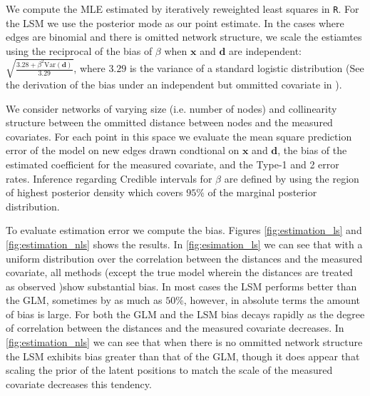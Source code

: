 \documentclass[11pt]{article}
\begin{document}
We compute the MLE estimated by iteratively reweighted least squares in \texttt{R}. For the LSM we use the posterior mode as our point estimate. In the cases where edges are binomial and there is omitted network structure, we scale the estiamtes using the reciprocal of the bias of $\beta$ when $\mathbf{x}$ and $\mathbf{d}$ are independent: $\sqrt{\frac{3.28 + \beta^2 \text{Var}(\mathbf{d})}{3.29}}$, where $3.29$ is the variance of a standard logistic distribution (See the derivation of the bias under an independent but ommitted covariate in \cite{mood2010logistic}).

We consider networks of varying size (i.e. number of nodes) and collinearity structure between the ommitted distance between nodes and the measured covariates. For each point in this space we evaluate the mean square prediction error of the model on new edges drawn condtional on $\mathbf{x}$ and $\mathbf{d}$, the bias of the estimated coefficient for the measured covariate, and the Type-1 and 2 error rates. Inference regarding Credible intervals for $\beta$ are defined by using the region of highest posterior density which covers $95\%$ of the marginal posterior distribution.

To evaluate estimation error we compute the bias. Figures \ref{fig:estimation_ls} and \ref{fig:estimation_nls} shows the results. In \ref{fig:esimation_ls} we can see that with a uniform distribution over the correlation between the distances and the measured covariate, all methods (except the true model wherein the distances are treated as observed )show substantial bias. In most cases the LSM performs better than the GLM, sometimes by as much as $50\%$, however, in absolute terms the amount of bias is large. For both the GLM and the LSM bias decays rapidly as the degree of correlation between the distances and the measured covariate decreases. In \ref{fig:estimation_nls} we can see that when there is no ommitted network structure the LSM exhibits bias greater than that of the GLM, though it does appear that scaling the prior of the latent positions to match the scale of the measured covariate decreases this tendency. 
\end{document}
